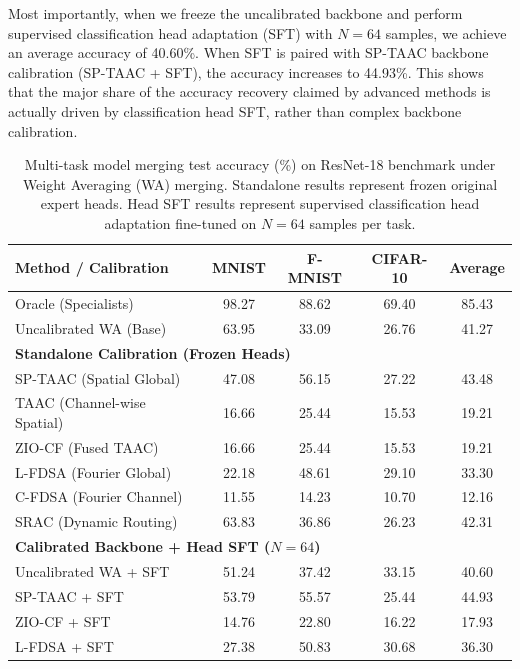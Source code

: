 \documentclass{article}
\theoremstyle{plain}
\theoremstyle{definition}
\theoremstyle{remark}
\begin{document}
Most importantly, when we freeze the uncalibrated backbone and perform supervised classification head adaptation (SFT) with $N=64$ samples, we achieve an average accuracy of 40.60\%. When SFT is paired with SP-TAAC backbone calibration (SP-TAAC + SFT), the accuracy increases to 44.93\%. This shows that the major share of the accuracy recovery claimed by advanced methods is actually driven by classification head SFT, rather than complex backbone calibration.

\begin{table}[t]
\caption{Multi-task model merging test accuracy (\%) on ResNet-18 benchmark under Weight Averaging (WA) merging. Standalone results represent frozen original expert heads. Head SFT results represent supervised classification head adaptation fine-tuned on $N=64$ samples per task.}
\label{tab:main_results}
\vskip 0.02in
\centering
\begin{footnotesize}
\begin{tabular}{lcccc}
\toprule
Method / Calibration & MNIST & F-MNIST & CIFAR-10 & Average \\
\midrule
Oracle (Specialists) & 98.27 & 88.62 & 69.40 & 85.43 \\
Uncalibrated WA (Base) & 63.95 & 33.09 & 26.76 & 41.27 \\
\midrule
\multicolumn{5}{l}{\textbf{Standalone Calibration (Frozen Heads)}} \\
SP-TAAC (Spatial Global) & 47.08 & 56.15 & 27.22 & 43.48 \\
TAAC (Channel-wise Spatial) & 16.66 & 25.44 & 15.53 & 19.21 \\
ZIO-CF (Fused TAAC) & 16.66 & 25.44 & 15.53 & 19.21 \\
L-FDSA (Fourier Global) & 22.18 & 48.61 & 29.10 & 33.30 \\
C-FDSA (Fourier Channel) & 11.55 & 14.23 & 10.70 & 12.16 \\
SRAC (Dynamic Routing) & 63.83 & 36.86 & 26.23 & 42.31 \\
\midrule
\multicolumn{5}{l}{\textbf{Calibrated Backbone + Head SFT ($N=64$)}} \\
Uncalibrated WA + SFT & 51.24 & 37.42 & 33.15 & 40.60 \\
SP-TAAC + SFT & 53.79 & 55.57 & 25.44 & 44.93 \\
ZIO-CF + SFT & 14.76 & 22.80 & 16.22 & 17.93 \\
L-FDSA + SFT & 27.38 & 50.83 & 30.68 & 36.30 \\
\bottomrule
\end{tabular}
\end{footnotesize}
\vskip -0.15in
\end{table}
\end{document}
